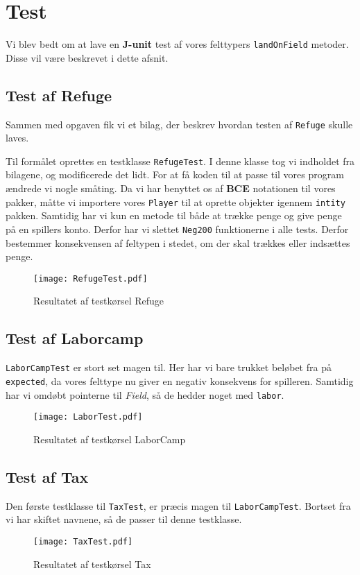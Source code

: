 \section{Test}
Vi blev bedt om at lave en \textbf{J-unit} test af vores felttypers \texttt{landOnField} metoder. Disse vil være beskrevet i dette afsnit.
\subsection{Test af Refuge}
Sammen med opgaven fik vi et bilag, der beskrev hvordan testen af \texttt{Refuge} skulle laves.


Til formålet oprettes en testklasse \texttt{RefugeTest}. I denne klasse tog vi indholdet fra bilagene, og modificerede det lidt. For at få koden til at passe til vores program ændrede vi nogle småting. Da vi har benyttet os af \textbf{BCE} notationen til vores pakker, måtte vi importere vores \texttt{Player} til at oprette objekter igennem \texttt{intity} pakken. Samtidig har vi kun en metode til både at trække penge og give penge på en spillers konto. Derfor har vi slettet \texttt{Neg200} funktionerne i  alle tests. Derfor bestemmer konsekvensen af feltypen i stedet, om der skal trækkes eller indsættes penge.
\begin{figure}[!ht]
\centering
\texttt{[image: RefugeTest.pdf]}
\caption[<Text for the list of figures>]{Resultatet af testkørsel Refuge}
\label{fig:testrefuge} 
\end{figure}
\subsection{Test af Laborcamp}
\texttt{LaborCampTest} er stort set magen til. Her har vi bare trukket beløbet fra på \texttt{expected}, da vores felttype nu giver en negativ konsekvens for spilleren. Samtidig har vi omdøbt pointerne til \textit{Field}, så de hedder noget med \texttt{labor}.
\begin{figure}[!ht]
\centering
\texttt{[image: LaborTest.pdf]}
\caption[<Text for the list of figures>]{Resultatet af testkørsel LaborCamp}
\label{fig:labor} 
\end{figure}
\subsection{Test af Tax}
Den første testklasse til \texttt{TaxTest}, er præcis magen til \texttt{LaborCampTest}. Bortset fra vi har skiftet navnene, så de passer til denne testklasse.
\begin{figure}[!ht]
\centering
\texttt{[image: TaxTest.pdf]}
\caption[<Text for the list of figures>]{Resultatet af testkørsel Tax}
\label{fig:testtax} 
\end{figure}
